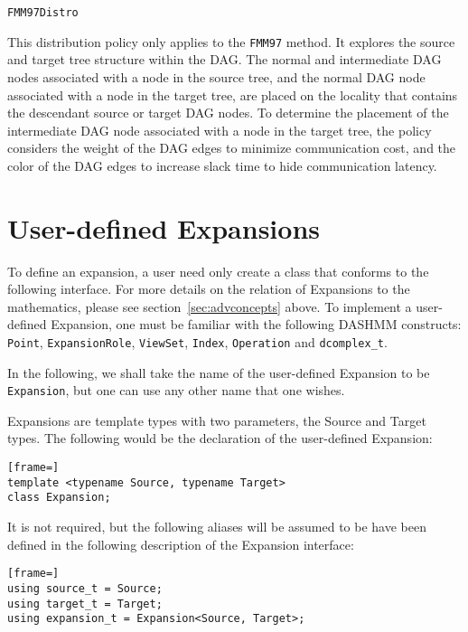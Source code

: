 \begin{lstlisting}
FMM97Distro
\end{lstlisting}

\noindent This distribution policy only applies to the \texttt{FMM97} method.
It explores the source and target tree structure within the DAG. The normal
and intermediate DAG nodes associated with a node in the source tree, and
the normal DAG node associated with a node in the target tree, are placed on
the locality that contains the descendant source or target DAG nodes. To
determine the placement of the intermediate DAG node associated with a node
in the target tree, the policy considers the weight of the DAG edges to
minimize communication cost, and the color of the DAG edges to increase slack
time to hide communication latency.


\section{User-defined Expansions}

To define an expansion, a user need only create a class that conforms to the
following interface. For more details on the relation of Expansions to the
mathematics, please see section~\ref{sec:advconcepts} above. To implement a
user-defined Expansion, one must be familiar with the following DASHMM
constructs: \texttt{Point}, \texttt{ExpansionRole}, \texttt{ViewSet},
\texttt{Index}, \texttt{Operation} and \texttt{dcomplex\_t}.

In the following, we shall take the name of the user-defined Expansion to
be \texttt{Expansion}, but one can use any other name that one wishes.

Expansions are template types with two parameters, the Source and Target
types. The following would be the declaration of the user-defined Expansion:

\begin{lstlisting}[frame=]
template <typename Source, typename Target>
class Expansion;
\end{lstlisting}

\noindent It is not required, but the following aliases will be assumed to be
have been defined in the following description of the Expansion interface:

\begin{lstlisting}[frame=]
using source_t = Source;
using target_t = Target;
using expansion_t = Expansion<Source, Target>;
\end{lstlisting}

